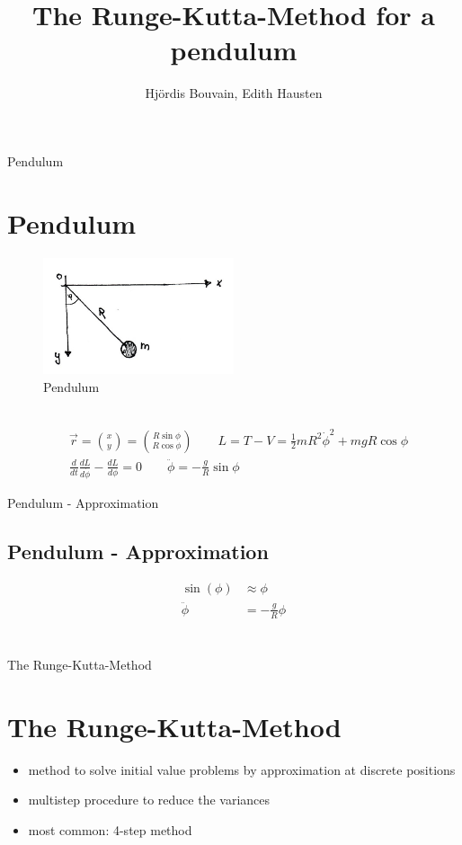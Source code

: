 \documentclass[9pt]{beamer}
\author{Hjördis Bouvain, Edith Hausten}
\title{The Runge-Kutta-Method for a pendulum}
\begin{document}
\begin{frame}
\titlepage
\end{frame}

\begin{frame}
\tableofcontents
\end{frame}

\begin{frame}{Pendulum}
\section{Pendulum}
\begin{figure}
\centering
	\includegraphics[width=0.5\textwidth]{Pendel.jpg}
	\caption{Pendulum}
\end{figure}
\\
\begin{align*}
&\vec{r} = {x \choose y} = {R\sin\phi \choose R\cos\phi} \qquad L = T-V = \frac{1}{2}mR^2\dot{\phi}^2+mgR\cos\phi 
\\
&\frac{d}{dt}\frac{dL}{d\dot{\phi}}-\frac{dL}{d\phi}=0 \qquad\ddot{\phi}=-\frac{g}{R}\sin{\phi}
\end{align*}
\end{frame}

\begin{frame}{Pendulum - Approximation}
\subsection{Pendulum - Approximation}
\begin{align*}
\sin(\phi) &\approx \phi \\
\ddot{\phi} &= -\frac{g}{R}\phi \\ 
\end{align*}
\\
\begin{center}
\textbf{}
\end{center}
\end{frame}

\begin{frame}{The Runge-Kutta-Method}
\section{The Runge-Kutta-Method}
\begin{itemize}
\item method to solve initial value problems by approximation at discrete positions \\
\item multistep procedure to reduce the variances
\item most common: 4-step method 
\end{itemize}
\end{frame}
\end{document}
